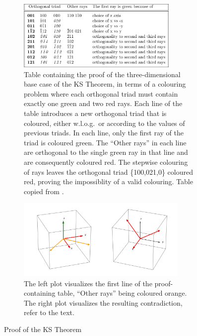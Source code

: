 \begin{figure}
\centering
\begin{subfigure}{\textwidth}
\centering
 \includegraphics[width=0.85\textwidth]{images/perestable.png}
 \caption{Table containing the proof of the three-dimensional base case of the KS Theorem, in terms of a colouring problem where each orthogonal triad must contain exactly one green and two red rays. Each line of the table introduces a new orthogonal triad that is coloured, either w.l.o.g.\ or according to the values of previous triads. In each line, only the first ray of the triad is coloured green. The ``Other rays'' in each line are orthogonal to the single green ray in that line and are consequently coloured red. The stepwise colouring of rays leaves the orthogonal triad \{100,021,0\} coloured red, proving the impossiblity of a valid colouring. Table copied from \cite{Peres1991}.}
 \label{fig:table}
\end{subfigure}
\hfill\break
\begin{subfigure}{\textwidth}
\centering
\includegraphics[width=0.9\textwidth]{images/triads.png}
\caption{The left plot visualizes the first line of the proof-containing table, ``Other rays'' being coloured orange. The right plot visualizes the resulting contradiction, refer to the text.}
\label{fig:triads}
\end{subfigure}
\caption{Proof of the KS Theorem}
\label{fig:ksproof}
\end{figure}

